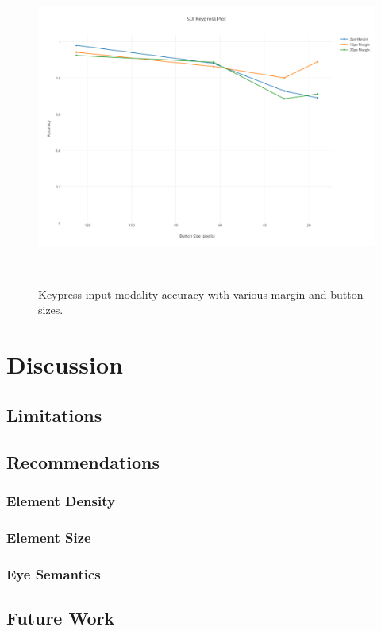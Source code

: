 \documentclass{sigchi}
\begin{document}
\begin{figure}
\centering
  \includegraphics[width=0.9\columnwidth]{figures/keypress-accuracy.pdf}
  \caption{Keypress input modality accuracy with various margin and button sizes.
  }~\label{fig:keypress-accuracy}
\end{figure}


\section{Discussion}


\subsection{Limitations}


\subsection{Recommendations}

\subsubsection{Element Density}

\subsubsection{Element Size}

\subsubsection{Eye Semantics}


\subsection{Future Work}
\end{document}
